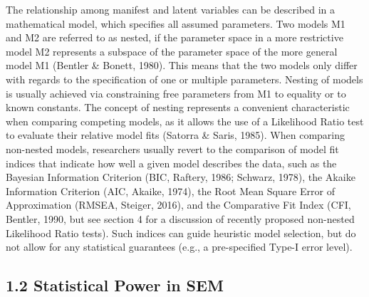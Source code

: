 \documentclass[
  man,floatsintext]{apa6}
\begin{document}
The relationship among manifest and latent variables can be described in a mathematical model, which specifies all assumed parameters. Two models M1 and M2 are referred to as nested, if the parameter space in a more restrictive model M2 represents a subspace of the parameter space of the more general model M1 (Bentler \& Bonett, 1980). This means that the two models only differ with regards to the specification of one or multiple parameters. Nesting of models is usually achieved via constraining free parameters from M1 to equality or to known constants. The concept of nesting represents a convenient characteristic when comparing competing models, as it allows the use of a Likelihood Ratio test to evaluate their relative model fits (Satorra \& Saris, 1985). When comparing non-nested models, researchers usually revert to the comparison of model fit indices that indicate how well a given model describes the data, such as the Bayesian Information Criterion (BIC, Raftery, 1986; Schwarz, 1978), the Akaike Information Criterion (AIC, Akaike, 1974), the Root Mean Square Error of Approximation (RMSEA, Steiger, 2016), and the Comparative Fit Index (CFI, Bentler, 1990, but see section 4 for a discussion of recently proposed non-nested Likelihood Ratio tests). Such indices can guide heuristic model selection, but do not allow for any statistical guarantees (e.g., a pre-specified Type-I error level).

\hypertarget{statistical-power-in-sem}{%
\subsection{1.2 Statistical Power in SEM}\label{statistical-power-in-sem}}
\end{document}
